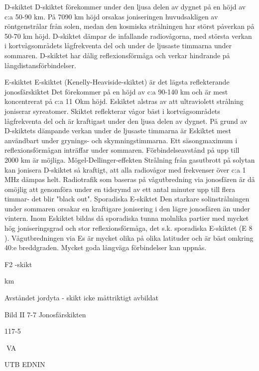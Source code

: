 D-skiktet
D-skiktet förekommer under den ljusa delen
av dygnet på en höjd av c:a 50-90 km. På 7090 km höjd orsakas joniseringen huvudsakligen av röntgenstrålar från solen, medan
den kosmiska strålningen har störst påverkan på 50-70 km höjd. D-skiktet dämpar de
infallande radiovågorna, med största verkan
i kortvågsområdets lågfrekventa del och under de ljusaste timmarna under sommaren.
D-skiktet har dålig reflexionsförmåga och
verkar hindrande på långdistansförbindelser.

E-skiktet
E-skiktet (Kenelly-Heaviside-skiktet) är det
lägsta reflekterande jonosfärskiktet Det förekommer på en höjd av c:a 90-140 km och
är mest koncentrerat på c:a 11 Okm höjd. Eskiktet alstras av att ultraviolett strålning
joniserar syreatomer. Skiktet reflekterar vågor bäst i kortvågsområdets lågfrekventa del
och är kraftigast under den ljusa delen av
dygnet. På grund av D-skiktets dämpande
verkan under de ljusaste timmarna är Eskiktet mest användbart under grynings- och
skymningstimmarna.
Ett säsongmaximum i reflexionsförmågan inträffar under sommaren. Förbindelseavstånd på upp till 2000 km är möjliga.
Mögel-Dellinger-effekten
Strålning från gasutbrott på solytan kan jonisera D-skiktet så kraftigt, att alla radiovågor
med frekvenser över c:a 1 MHz dämpas helt.
Radiotrafik som baseras på vågutbredning
via jonosfären är då omöjlig att genomföra
under en tidsrymd av ett antal minuter upp till
flera timmar- det blir "black out".
Sporadiska E-skiktet
Den starkare solinstrålningen under sommaren orsakar en kraftigare jonisering i den
lägre jonosfären än under vintern. Inom Eskiktet bildas då sporadiska tunna molnlika
partier med mycket hög joniseringsgrad och
stor reflexionsförmåga, det s.k. sporadiska
E-skiktet (E 8 ). Vågutbredningen via Es är
mycket olika på olika latituder och är bäst
omkring 40:e breddgraden. Mycket goda
långväga förbindelser kan uppnås.

F2 -skikt

km

Avståndet jordyta - skikt icke måttriktigt avbildat

Bild II 7-7 Jonosfärskikten

117-5

VA

UTB EDNIN

